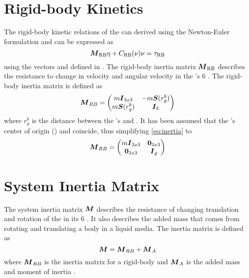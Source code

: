 \section{Rigid-body Kinetics}
The rigid-body kinetic relations of the \abbrROV can derived using the Newton-Euler formulation and can be expressed as
\begin{equation}
\boldsymbol{M}_{\text{RB}}\eta + C_{\text{RB}}(\nu)\nu = \tau_{\text{RB}}
\end{equation}
using the vectors \etaVector and \nuVector defined in  \citep[p. 45]{fossen2011}.
The rigid-body inertia matrix $\boldsymbol{M}_{\text{RB}}$ describes the resistance to change in velocity and angular velocity in the \abbrROV's  6 \abbrDOF. The rigid-body inertia matrix is defined as 
\begin{equation}
\label{eq:inertia}
    \boldsymbol{M}_{RB} = 
    \begin{pmatrix}
    m\boldsymbol{I}_{3x3}       & -m\boldsymbol{S}(r^b_g) \\
    m\boldsymbol{S}(r^b_g) & \boldsymbol{I}_{b}
    \end{pmatrix}
\end{equation}
where $r^b_g$ is the distance between the \abbrROV's \abbrCO and \abbrCG \citep[p. 52]{fossen2011}.
It has been assumed that the \abbrROV's center of origin (\abbrCO) and \abbrCG coincide, thus simplifying \eqref{eq:inertia} to
\begin{equation}
   \boldsymbol{M}_{RB} = 
    \begin{pmatrix}
        m\boldsymbol{I}_{3x3} & \boldsymbol{0}_{3x3} \\
        \boldsymbol{0}_{3x3} & \boldsymbol{I}_{g}
    \end{pmatrix}
\end{equation}
\section{System Inertia Matrix}
The system inertia matrix $\boldsymbol{M}$ describes the resistance of changing translation and rotation of the \abbrROV in its 6 \abbrDOF. It also describes the added mass that comes from rotating and translating a body in a liquid media. The inertia matrix is defined as
\begin{equation}
    \boldsymbol{M} = \boldsymbol{M}_{RB}+\boldsymbol{M}_{A}
\end{equation}
where $\boldsymbol{M}_{RB}$ is the inertia matrix for a rigid-body and $\boldsymbol{M}_{A}$ is the added mass and moment of inertia \citep{fossen2011}.  

